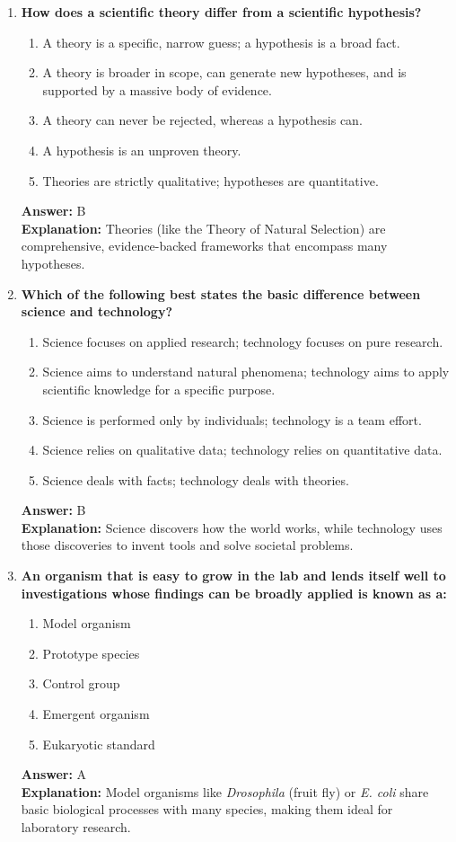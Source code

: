 \documentclass[11pt, a4paper]{article}
\begin{document}
\begin{enumerate}
\item \textbf{How does a scientific theory differ from a scientific hypothesis?}
\begin{enumerate}[label=\Alph*.]
    \item A theory is a specific, narrow guess; a hypothesis is a broad fact.
    \item A theory is broader in scope, can generate new hypotheses, and is supported by a massive body of evidence.
    \item A theory can never be rejected, whereas a hypothesis can.
    \item A hypothesis is an unproven theory.
    \item Theories are strictly qualitative; hypotheses are quantitative.
\end{enumerate}
\textbf{Answer:} B \\
\textbf{Explanation:} Theories (like the Theory of Natural Selection) are comprehensive, evidence-backed frameworks that encompass many hypotheses.

\item \textbf{Which of the following best states the basic difference between science and technology?}
\begin{enumerate}[label=\Alph*.]
    \item Science focuses on applied research; technology focuses on pure research.
    \item Science aims to understand natural phenomena; technology aims to apply scientific knowledge for a specific purpose.
    \item Science is performed only by individuals; technology is a team effort.
    \item Science relies on qualitative data; technology relies on quantitative data.
    \item Science deals with facts; technology deals with theories.
\end{enumerate}
\textbf{Answer:} B \\
\textbf{Explanation:} Science discovers how the world works, while technology uses those discoveries to invent tools and solve societal problems.

\item \textbf{An organism that is easy to grow in the lab and lends itself well to investigations whose findings can be broadly applied is known as a:}
\begin{enumerate}[label=\Alph*.]
    \item Model organism
    \item Prototype species
    \item Control group
    \item Emergent organism
    \item Eukaryotic standard
\end{enumerate}
\textbf{Answer:} A \\
\textbf{Explanation:} Model organisms like \textit{Drosophila} (fruit fly) or \textit{E. coli} share basic biological processes with many species, making them ideal for laboratory research.


\end{enumerate}
\end{document}
